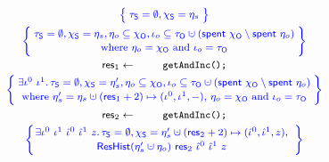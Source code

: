 \begin{figure}
\centering
%    
\[
\!\!\!
{\small{
\begin{array}{c}
  \spec{\!\!
  \begin{array}{c}
    \tkns = \emptyset,
    \hists = \gists
  \end{array}
  \!\!}
\\\\[-6pt]
\spec{\!\!
  \begin{array}{c}
    \tkns = \emptyset,
    \hists = \gists,
    \gisto \subseteq \histo,
    \ikno \subseteq \tkno \hunion (\Tomb~\histo \setminus \Tomb~\gisto)\\[2pt]
    \mbox{where $\gisto = \histo$ and $\ikno = \tkno$}
  \end{array}
  \!\!}
\\\\[-6pt]
\res_1 \Asgn \esc{getAndInc();}
\\[3pt]
\spec{\!\!
\begin{array}{c}
   \exists \ikn^0~\ikn^1 \ldot 
   \tkns = \emptyset, \hists = \gists', \gisto \subseteq \histo, \ikno \subseteq \tkno \hunion (\Tomb~\histo \setminus \Tomb~\gisto)\\[2pt]
   \mbox{where $\gists' = \gists \hunion (\res_1 + 2) \hpts (\ikn^0, \ikn^1, -)$, $\gisto = \histo$ and $\ikno = \tkno$}
  \end{array}
  \!\!}%
\\\\[-5pt] 
\res_2 \Asgn \esc{getAndInc();}
\\[3pt]
\spec{\!\!\!
\begin{array}{c}
  \exists \ikn^0~\ikn^1~\iknh^0~\iknh^1~z \ldot     
  \tkns = \emptyset, \hists = \gists' \hunion (\res_2+2) \mapsto (\iknh^0, \iknh^1, z),\\[2pt]
  \happrox (\gists' \hunion \gisto)~\res_2~\iknh^0~\iknh^1~z
\end{array}
}
\end{array}}}\]
\end{figure}
